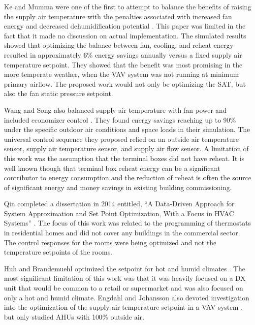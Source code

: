 Ke and Mumma were one of the first to attempt to balance the benefits of raising the supply air temperature with the penalties associated with increased fan energy and decreased dehumidification potential \cite{Ke1997OptimizedSystems}. This paper was limited in the fact that it made no discussion on actual implementation. The simulated results showed that optimizing the balance between fan, cooling, and reheat energy resulted in approximately 6\% energy savings annually versus a fixed supply air temperature setpoint. They showed that the benefit was most promising in the more temperate weather, when the VAV system was not running at minimum primary airflow. The proposed work would not only be optimizing the SAT, but also the fan static pressure setpoint.   

Wang and Song also balanced supply air temperature with fan power and included economizer control \cite{Wang2012AirCycles}. They found energy savings reaching up to 90\% under the specific outdoor air conditions and space loads in their simulation. The universal control sequence they proposed relied on an outside air temperature sensor, supply air temperature sensor, and supply air flow sensor. A limitation of this work was the assumption that the terminal boxes did not have reheat. It is well known though that terminal box reheat energy can be a significant contributor to energy consumption and the reduction of reheat is often the source of significant energy and money savings in existing building commissioning.  

Qin completed a dissertation in 2014 entitled, ``A Data-Driven Approach for System Approximation and Set Point Optimization, With a Focus in HVAC Systems'' \cite{Qin_2014_Res_Letters}. The focus of this work was related to the programming of thermostats in residential homes and did not cover any buildings in the commercial sector. The control responses for the rooms were being optimized and not the temperature setpoints of the rooms.  

Huh and Brandemuehl optimized the setpoint for hot and humid climates \cite{Huh2008}. The most significant limitation of this work was that it was heavily focused on a DX unit that would be common to a retail or supermarket and was also focused on only a hot and humid climate. Engdahl and Johansson also devoted investigation into the optimization of the supply air temperature setpoint in a VAV system \cite{Engdahl2004}, but only studied AHUs with 100\% outside air. 

